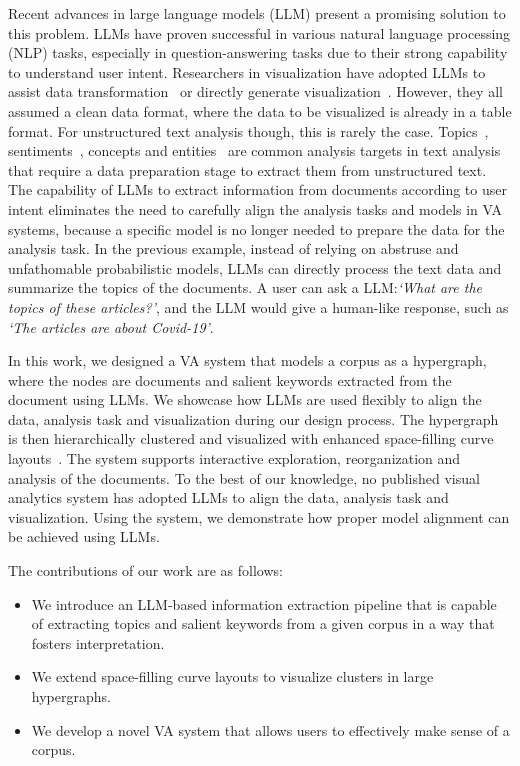 Recent advances in large language models (LLM) present a promising solution to this problem.
LLMs have proven successful in various natural language processing (NLP) tasks, especially in question-answering tasks due to their strong capability to understand user intent.
Researchers in visualization have adopted LLMs to assist data transformation~\cite{wang2023dataformulator} or directly generate visualization~\cite{maddigan2023chat2vis}.
However, they all assumed a clean data format, where the data to be visualized is already in a table format. 
For unstructured text analysis though, this is rarely the case.
Topics~\cite{atzberger2023evaluatetopicmodel}, sentiments~\cite{beasley2021through}, concepts and entities~\cite{park2018conceptvector,cao2010facetatlas} are common analysis targets in text analysis that require a data preparation stage to extract them from unstructured text.
The capability of LLMs to extract information from documents according to user intent eliminates the need to carefully align the analysis tasks and models in VA systems,
because a specific model is no longer needed to prepare the data for the analysis task.
In the previous example, instead of relying on abstruse and unfathomable probabilistic models, LLMs can directly process the text data and summarize the topics of the documents.
A user can ask a LLM:\@ \textit{`What are the topics of these articles?'}, and the LLM would give a human-like response, such as \textit{`The articles are about Covid-19'}.

In this work, we designed a VA system that models a corpus as a hypergraph, where the nodes are documents and salient keywords extracted from the document using LLMs.
We showcase how LLMs are used flexibly to align the data, analysis task and visualization during our design process.
The hypergraph is then hierarchically clustered and visualized with enhanced space-filling curve layouts~\cite{muelder2008sfc}.
The system supports interactive exploration, reorganization and analysis of the documents.
To the best of our knowledge, no published visual analytics system has adopted LLMs to align the data, analysis task and visualization.
Using the system, we demonstrate how proper model alignment can be achieved using LLMs.

The contributions of our work are as follows:
\begin{itemize}
    \item We introduce an LLM-based information extraction pipeline that is capable of extracting topics and salient keywords from a given corpus in a way that fosters interpretation.
    \item We extend space-filling curve layouts to visualize clusters in large hypergraphs.
    \item We develop a novel VA system that allows users to effectively make sense of a corpus.
\end{itemize}